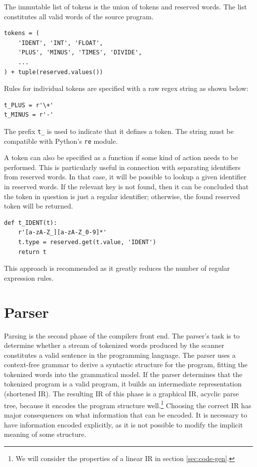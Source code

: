 The immutable list of tokens is the union of tokens and reserved words. The list constitutes all valid words of the source program.

\begin{verbatim}
tokens = (
    'IDENT', 'INT', 'FLOAT',
    'PLUS', 'MINUS', 'TIMES', 'DIVIDE',
    ...
) + tuple(reserved.values())
\end{verbatim}

Rules for individual tokens are specified with a raw regex string as shown below:

\begin{verbatim}
t_PLUS = r'\+'
t_MINUS = r'-'
\end{verbatim}

The prefix \texttt{t\_} is used to indicate that it defines a token. The string must be compatible with Python's \texttt{re} module.

A token can also be specified as a function if some kind of action needs to be performed. This is particularly useful in connection with separating identifiers from reserved words. In that case, it will be possible to lookup a given identifier in reserved words. If the relevant key is not found, then it can be concluded that the token in question is just a regular identifier; otherwise, the found reserved token will be returned.

\begin{verbatim}
def t_IDENT(t):
    r'[a-zA-Z_][a-zA-Z_0-9]*'
    t.type = reserved.get(t.value, 'IDENT')
    return t
\end{verbatim}

This approach is recommended as it greatly reduces the number of regular expression rules.

\section{Parser}
Parsing is the second phase of the compilers front end. The parser's task is to determine whether a stream of tokenized words produced by the scanner constitutes a valid sentence in the programming language. The parser uses a context-free grammar to derive a syntactic structure for the program, fitting the tokenized words into the grammatical model. If the parser determines that the tokenized program is a valid program, it builds an intermediate representation (shortened IR). The resulting IR of this phase is a graphical IR, acyclic parse tree, because it encodes the program structure well.\footnote{We will consider the properties of a linear IR in section \ref{sec:code-gen}.} Choosing the correct IR has major consequences on what information that can be encoded. It is necessary to have information encoded explicitly, as it is not possible to modify the implicit meaning of some structure.

